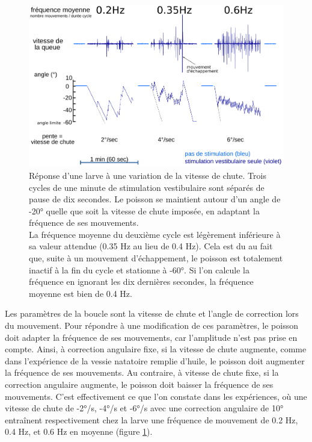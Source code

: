     
\begin{figure}
    \centering
    \includegraphics[width=\textwidth]{./files/variation-vitesse.svg.png}
    \caption{
    Réponse d'une larve à une variation de la vitesse de chute. Trois cycles de une minute de stimulation vestibulaire sont séparés de pause de dix secondes. Le poisson se maintient autour d'un angle de -20° quelle que soit la vitesse de chute imposée, en adaptant la fréquence de ses mouvements.
    \\La fréquence moyenne du deuxième cycle est légèrement inférieure à sa valeur attendue (0.35 Hz au lieu de 0.4 Hz). Cela est du au fait que, suite à un mouvement d'échappement, le poisson est totalement inactif à la fin du cycle et stationne à -60°. Si l'on calcule la fréquence en ignorant les dix dernières secondes, la fréquence moyenne est bien de 0.4 Hz.
    \label{FIGvariationvitesse}}
    \end{figure}


Les paramètres de la boucle sont la vitesse de chute et l'angle de correction lors du mouvement. Pour répondre à une modification de ces paramètres, le poisson doit adapter la fréquence de ses mouvements, car l'amplitude n'est pas prise en compte. Ainsi, à correction angulaire fixe, si la vitesse de chute augmente, comme dans l'expérience de la vessie natatoire remplie d'huile, le poisson doit augmenter la fréquence de ses mouvements. Au contraire, à vitesse de chute fixe, si la correction angulaire augmente, le poisson doit baisser la fréquence de ses mouvements. C'est effectivement ce que l'on constate dans les expériences, où une vitesse de chute de -2°/s, -4°/s et -6°/s avec une correction angulaire de 10° entraînent respectivement chez la larve une fréquence de mouvement de 0.2 Hz, 0.4 Hz, et 0.6 Hz en moyenne (figure \ref{FIGvariationvitesse}).

